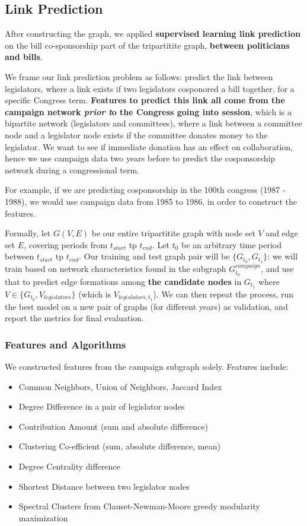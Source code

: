\documentclass[12pt,twocolumn]{article}
\begin{document}
\subsection{Link Prediction}
After constructing the graph, we applied \textbf{supervised learning link prediction} on the bill co-sponsorship part of the tripartitite graph, \textbf{between politicians and bills}.

We frame our link prediction problem as follows: predict the link between legislators, where a link exists if two legislators cosponored a bill together, for a specific Congress term.  \textbf{Features to predict this link all come from the campaign network \textit{prior t}o the Congress going into session}, which is a bipartite network (legislators and committees), where a link between a committee node and a legislator node exists if the committee donates money to the legislator.  We want to see if immediate donation has an effect on collaboration, hence we use campaign data two years before to predict the cosponsorship network during a congressional term. 

For example, if we are predicting cosponsorship in the 100th congress (1987 - 1988), we would use campaign data from 1985 to 1986, in order to construct the features.

Formally, let $G(V,E)$ be our entire tripartitite graph with node set $V$ and edge set $E$, covering periods from $t_{start}$ tp $t_{end}$. Let $t_0$ be an arbitrary time period between  $t_{start}$ tp $t_{end}$. Our training and test graph pair will be $\{G_{t_{0}}, G_{t_{1}}\}$: we will train based on network characteristics found in the subgraph $G^{campaign}_{t_{0}}$, and use that to predict edge formations among \textbf{the candidate nodes} in $G_{t_{1}}$ where $V \in \{G_{t_{0}}, V_{legislators}\}$ (which is $V_{legislators, t_1}$). We can then repeat the process, run the best model on a new pair of graphs (for different years) as validation, and report the metrics for final evaluation. 

\subsubsection{Features and Algorithms}
We constructed features from the campaign subgraph solely. Features include: 
\begin{itemize}
\item Common Neighbors, Union of Neighbors, Jaccard Index
\item Degree Difference in a pair of legislator nodes
\item Contribution Amount (sum and absolute difference)
\item Clustering Co-efficient (sum, absolute difference, mean)
\item Degree Centrality difference
\item Shortest Distance between two legislator nodes
\item Spectral Clusters from Clauset-Newman-Moore greedy modularity maximization
\end{itemize}
\end{document}
